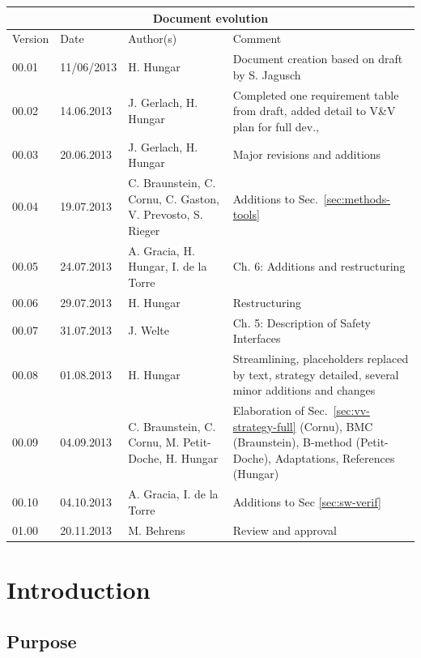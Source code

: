 \documentclass{template/openetcs_report}
\begin{document}
\begin{tabular}{|p{1.5cm}|p{2cm}|p{3.5cm}|p{6cm}|}
\hline
\multicolumn{4}{|c|}{Document evolution} \\
\hline
Version &  Date & Author(s) & Comment  \\
\hline  
00.01 & 11/06/2013 & H. Hungar &  Document creation based on draft by
S. Jagusch\\
\hline
00.02 & 14.06.2013 & J. Gerlach, H. Hungar &  Completed one
requirement table from draft, added detail to V\&V plan for full dev., \\
\hline  
00.03 & 20.06.2013 & J. Gerlach, H. Hungar & Major revisions and
additions
\\\hline
00.04 & 19.07.2013 & C. Braunstein, C. Cornu, C. Gaston, V. Prevosto,
S. Rieger & Additions to Sec.~\ref{sec:methods-tools}
\\\hline
00.05 & 24.07.2013 & A. Gracia, H. Hungar, I. de la Torre & Ch. 6: Additions and
restructuring 
\\\hline
00.06 & 29.07.2013 & H. Hungar & Restructuring
\\\hline
00.07 & 31.07.2013 & J. Welte & Ch. 5: Description of Safety Interfaces
\\\hline
00.08 & 01.08.2013 & H. Hungar & Streamlining, placeholders replaced
by text, strategy detailed, several minor additions and changes
\\\hline
00.09 & 04.09.2013 & C. Braunstein, C. Cornu, M. Petit-Doche, H. Hungar & Elaboration of
Sec.~\ref{sec:vv-strategy-full} (Cornu), BMC (Braunstein), B-method
(Petit-Doche), Adaptations, References (Hungar)
\\
\hline
00.10 & 04.10.2013 & A. Gracia, I. de la Torre & Additions to Sec \ref{sec:sw-verif}
\\\hline
01.00 & 20.11.2013 & M. Behrens & Review and approval
\\\hline
\end{tabular}




\mainmatter

\chapter{Introduction}

\section{Purpose}
\label{sec:purpose}
\end{document}
